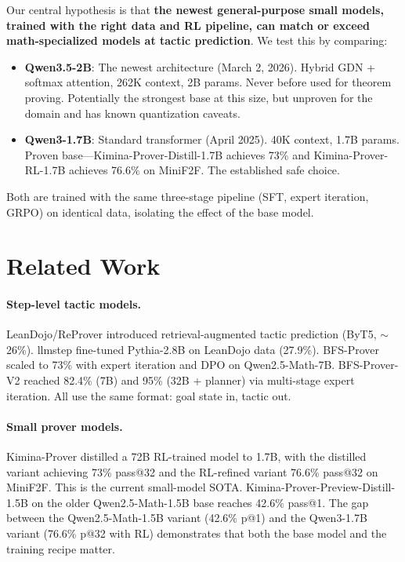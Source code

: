 \documentclass[11pt,a4paper]{article}
\begin{document}
Our central hypothesis is that \textbf{the newest general-purpose small models, trained with the right data and RL pipeline, can match or exceed math-specialized models at tactic prediction}. We test this by comparing:

\begin{itemize}
\item \textbf{Qwen3.5-2B}: The newest architecture (March 2, 2026). Hybrid GDN + softmax attention, 262K context, 2B params. Never before used for theorem proving. Potentially the strongest base at this size, but unproven for the domain and has known quantization caveats.
\item \textbf{Qwen3-1.7B}: Standard transformer (April 2025). 40K context, 1.7B params. Proven base---Kimina-Prover-Distill-1.7B achieves 73\% and Kimina-Prover-RL-1.7B achieves 76.6\% on MiniF2F. The established safe choice.
\end{itemize}

Both are trained with the same three-stage pipeline (SFT, expert iteration, GRPO) on identical data, isolating the effect of the base model.

\section{Related Work}
\label{sec:related}

\paragraph{Step-level tactic models.} LeanDojo/ReProver \citep{leandojo} introduced retrieval-augmented tactic prediction (ByT5, $\sim$26\%). llmstep \citep{llmstep} fine-tuned Pythia-2.8B on LeanDojo data (27.9\%). BFS-Prover \citep{bfsprover1} scaled to 73\% with expert iteration and DPO on Qwen2.5-Math-7B. BFS-Prover-V2 \citep{bfsprover2} reached 82.4\% (7B) and 95\% (32B + planner) via multi-stage expert iteration. All use the same format: goal state in, tactic out.

\paragraph{Small prover models.} Kimina-Prover \citep{kimina} distilled a 72B RL-trained model to 1.7B, with the distilled variant achieving 73\% pass@32 and the RL-refined variant 76.6\% pass@32 on MiniF2F. This is the current small-model SOTA. Kimina-Prover-Preview-Distill-1.5B on the older Qwen2.5-Math-1.5B base reaches 42.6\% pass@1. The gap between the Qwen2.5-Math-1.5B variant (42.6\% p@1) and the Qwen3-1.7B variant (76.6\% p@32 with RL) demonstrates that both the base model and the training recipe matter.
\end{document}
